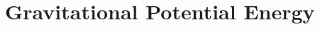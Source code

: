 \documentclass[12pt,compress,aspectratio=169]{beamer}
\begin{document}

\section{Gravitational Potential Energy}
\end{document}
